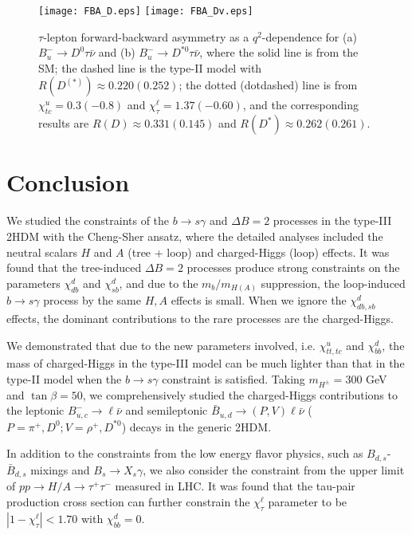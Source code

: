 \documentclass[prd,preprint,superscriptaddress,amsmath,amssymb]{revtex4}
\begin{document}
     \begin{figure}[phtb]
\texttt{[image: FBA\_D.eps]}
\texttt{[image: FBA\_Dv.eps]}
\caption{ $\tau$-lepton forward-backward asymmetry as a $q^2$-dependence for (a) $B^-_u \to D^0 \tau \bar\nu$ and (b) $B^-_u \to D^{*0} \tau \bar\nu$,  where the solid line is from the SM; the dashed line is the type-II model with $R(D^{(*)})\approx 0.220(0.252)$; the dotted (dotdashed) line is from  $\chi^u_{tc}=0.3 (-0.8)$ and $\chi^\ell_\tau=1.37(-0.60)$, and the corresponding results are $R(D) \approx 0.331(0.145)$ and $R(D^*)\approx 0.262(0.261)$.   }
\label{fig:FBA}
\end{figure} 
  
  
  
  \section{Conclusion}
  
  We studied the constraints of the $b\to s \gamma$ and $\Delta B=2$ processes in the type-III 2HDM with the Cheng-Sher ansatz, where the detailed analyses included the neutral scalars $H$ and $A$ (tree + loop) and charged-Higgs (loop) effects. It was found that the tree-induced $\Delta B=2$ processes produce strong constraints on the parameters $\chi^d_{db}$ and $\chi^d_{sb}$, and due to the $m_b/m_{H(A)}$ suppression, the loop-induced $b\to s \gamma$ process by the same $H, A$ effects is small. When we ignore the $\chi^d_{db, sb}$ effects, the dominant contributions to the rare processes are the charged-Higgs.  
  
  We demonstrated  that due to the new parameters involved, i.e. $\chi^u_{tt,tc}$ and $\chi^d_{bb}$, the mass of charged-Higgs in the type-III model can be much lighter than that in the type-II model when  the $b\to s \gamma$ constraint is satisfied. Taking $m_{H^\pm}=300$ GeV and $\tan\beta=50$, we comprehensively studied the charged-Higgs contributions to the leptonic $B^-_{u,c} \to \ell \bar \nu$ and semileptonic $\bar B_{u,d} \to (P ,V) \ell \bar\nu$ ($P=\pi^+, D^0; V= \rho^+, D^{*0}$) decays in the generic 2HDM.
  
  In addition to the constraints from the low energy flavor physics, such as $B_{d,s}$-$\bar B_{d,s}$ mixings and $B_s \to X_s \gamma$, we also consider the constraint from the upper limit of  $pp\to H/A\to \tau^+ \tau^-$ measured in LHC. It was found that the tau-pair production cross section can further constrain the $\chi^\ell_{\tau}$ parameter to be $|1-\chi^\ell_\tau|<1.70$  with $\chi^d_{bb}=0$. 
  
\end{document}
